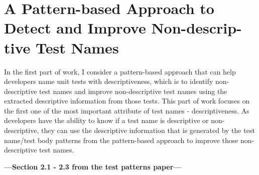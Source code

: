 \section{A Pattern-based Approach to Detect and Improve Non-descrip-\\tive Test Names}
\label{sec:test-pattern-section}

In the first part of work, I consider a pattern-based approach that can help developers name unit tests with descriptiveness, which is to identify non-descriptive test names and improve non-descriptive test names using the extracted descriptive information from those tests.
%
This part of work focuses on the first one of the most important attribute of test names - descriptiveness.
%
As developers have the ability to know if a test name is descriptive or non-descriptive, they can use the descriptive information that is generated by the test name\slash test body patterns from the pattern-based approach to improve those non-descriptive test names.

\textbf{---Section 2.1 - 2.3 from the test patterns paper---}






